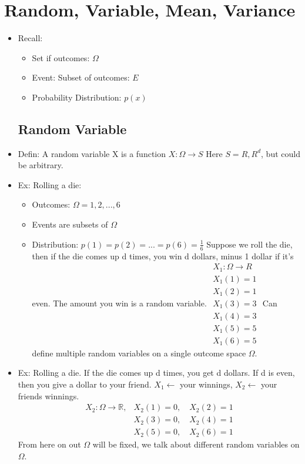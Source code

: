 \section{Random, Variable, Mean, Variance}
\begin{itemize}
\item Recall: 
\begin{itemize}
	\item Set if outcomes:  $\Omega$
	\item Event: Subset of outcomes: $E$
	\item Probability Distribution: $p(x)$
\end{itemize}
\subsection{Random Variable}
\item Defin: A random variable X is a function $X: \Omega \rightarrow S$ Here $ S=R, R^{d}$, but could be arbitrary.
 \item Ex: Rolling a die:
 \begin{itemize}
 	\item Outcomes: $\Omega={1,2,...,6}$
 	\item Events are subsets of $\Omega$
 	\item Distribution: $p(1)=p(2)=...=p(6)=\frac{1}{6}$
 	Suppose we roll the die, then if the die comes up d times, you win d dollars, minus 1 dollar if it's even. The amount you win is a random variable. \newline
 	$\begin{array}{l}
 		X_{1}: \Omega \rightarrow R\\
 		X_{1}(1)=1 \\
 		X_{1}(2)=1 \\
 		X_{1}(3)=3 \\
 		X_{1}(4)=3 \\
 		X_{1}(5)=5 \\
 		X_{1}(6)=5
 	\end{array}$ \newline
 	Can define multiple random variables on a single outcome space $\Omega$. 	
 \end{itemize}  
\item Ex: Rolling a die. If the die comes up d times, you get d dollars. If d is even, then you give a dollar to your friend.\newline
$X_{1} \leftarrow$ your winnings,
$X_{2}\leftarrow$ your friends winnings. \newline
$$
\begin{aligned}
	X_{2}: \Omega \rightarrow \mathbb{R}, & X_{2}(1)=0, \quad X_{2}(2)=1 \\
	& X_{2}(3)=0, \quad X_{2}(4)=1 \\
	& X_{2}(5)=0, \quad X_{2}(6)=1
\end{aligned}
$$
From here on out $\Omega$ will be fixed, we talk about different random variables on $\Omega$.

\end{itemize}
